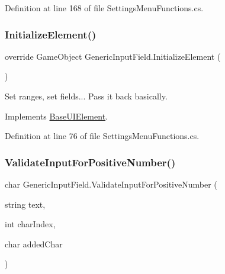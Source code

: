 Definition at line 168 of file Settings\+Menu\+Functions.\+cs.

\mbox{\label{class_generic_input_field_ad85e395f57d5dbf74ae74684c06b06b3}} 
\subsubsection{\texorpdfstring{Initialize\+Element()}{InitializeElement()}}
{\footnotesize\ttfamily override Game\+Object Generic\+Input\+Field.\+Initialize\+Element (\begin{DoxyParamCaption}{ }\end{DoxyParamCaption})\hspace{0.3cm}{\ttfamily [virtual]}}



Set ranges, set fields... Pass it back basically. 



Implements \hyperlink{class_base_u_i_element_a9a0aa6ac0b194f90e092b372adce4e30}{Base\+U\+I\+Element}.



Definition at line 76 of file Settings\+Menu\+Functions.\+cs.

\mbox{\label{class_generic_input_field_a26e2d9ef076892ccb1c37c91ae0f12ea}} 
\subsubsection{\texorpdfstring{Validate\+Input\+For\+Positive\+Number()}{ValidateInputForPositiveNumber()}}
{\footnotesize\ttfamily char Generic\+Input\+Field.\+Validate\+Input\+For\+Positive\+Number (\begin{DoxyParamCaption}\item[{string}]{text,  }\item[{int}]{char\+Index,  }\item[{char}]{added\+Char }\end{DoxyParamCaption})}



